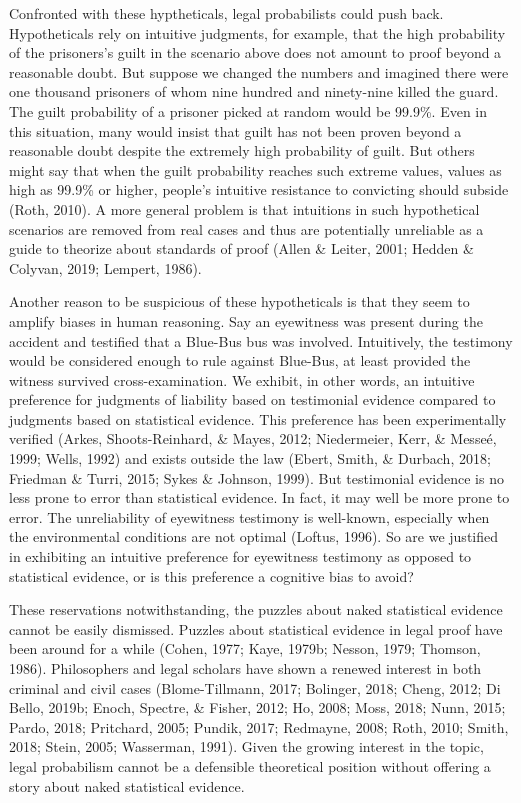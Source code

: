 \documentclass[10pt,dvipsnames,enabledeprecatedfontcommands]{scrartcl}
\begin{document}
Confronted with these hyptheticals, legal probabilists could push back.
Hypotheticals rely on intuitive judgments, for example, that the high
probability of the prisoners's guilt in the scenario above does not
amount to proof beyond a reasonable doubt. But suppose we changed the
numbers and imagined there were one thousand prisoners of whom nine
hundred and ninety-nine killed the guard. The guilt probability of a
prisoner picked at random would be 99.9\%. Even in this situation, many
would insist that guilt has not been proven beyond a reasonable doubt
despite the extremely high probability of guilt. But others might say
that when the guilt probability reaches such extreme values, values as
high as 99.9\% or higher, people's intuitive resistance to convicting
should subside (Roth, 2010). A more general problem is that intuitions
in such hypothetical scenarios are removed from real cases and thus are
potentially unreliable as a guide to theorize about standards of proof
(Allen \& Leiter, 2001; Hedden \& Colyvan, 2019; Lempert, 1986).

Another reason to be suspicious of these hypotheticals is that they seem
to amplify biases in human reasoning. Say an eyewitness was present
during the accident and testified that a Blue-Bus bus was involved.
Intuitively, the testimony would be considered enough to rule against
Blue-Bus, at least provided the witness survived cross-examination. We
exhibit, in other words, an intuitive preference for judgments of
liability based on testimonial evidence compared to judgments based on
statistical evidence. This preference has been experimentally verified
(Arkes, Shoots-Reinhard, \& Mayes, 2012; Niedermeier, Kerr, \& Messeé,
1999; Wells, 1992) and exists outside the law (Ebert, Smith, \& Durbach,
2018; Friedman \& Turri, 2015; Sykes \& Johnson, 1999). But testimonial
evidence is no less prone to error than statistical evidence. In fact,
it may well be more prone to error. The unreliability of eyewitness
testimony is well-known, especially when the environmental conditions
are not optimal (Loftus, 1996). So are we justified in exhibiting an
intuitive preference for eyewitness testimony as opposed to statistical
evidence, or is this preference a cognitive bias to avoid?

These reservations notwithstanding, the puzzles about naked statistical
evidence cannot be easily dismissed. Puzzles about statistical evidence
in legal proof have been around for a while (Cohen, 1977; Kaye, 1979b;
Nesson, 1979; Thomson, 1986). Philosophers and legal scholars have shown
a renewed interest in both criminal and civil cases (Blome-Tillmann,
2017; Bolinger, 2018; Cheng, 2012; Di Bello, 2019b; Enoch, Spectre, \&
Fisher, 2012; Ho, 2008; Moss, 2018; Nunn, 2015; Pardo, 2018; Pritchard,
2005; Pundik, 2017; Redmayne, 2008; Roth, 2010; Smith, 2018; Stein,
2005; Wasserman, 1991). Given the growing interest in the topic, legal
probabilism cannot be a defensible theoretical position without offering
a story about naked statistical evidence.
\end{document}
